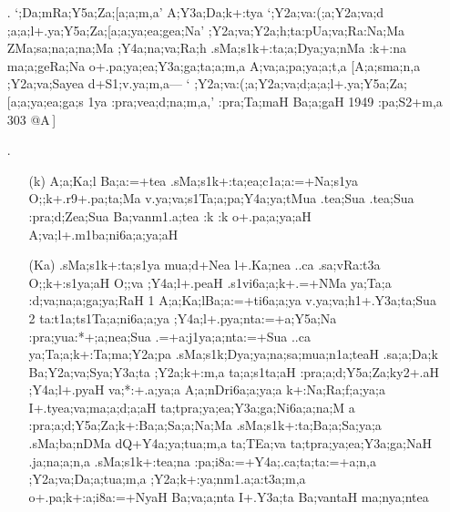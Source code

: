 \begin{spacing}{1.15}
\begin{itemize}
 \item[{\sktf 6}.]  `{\sktf ;Da;mRa;Y5a;Za;[a;a;m,a}' {\sktf
A;Y3a;Da;k+:tya} `{\sktf ;Y2a;va:(;a;Y2a;va;d%
;a;a;l+.ya\ZF{-};Y5a;Za;[a;a;ya;ea;gea;Na}' {\sktf
;Y2a;va;Y2a;h;ta\ZF{-}:pUa{;va;Ra}{:Na;Ma}} {\sktf ZMa;sa;na;a;na;Ma ;Y4a;na;va;Ra;h\ZF{,}} {\sktf
.sMa;s1k+:ta;a;Dya;ya;nMa :k+:na ma;a;geRa;Na
o+.pa;ya;ea;Y3a;ga;ta;a;m,a A;va;a;pa;ya;a;t,a%
} [{\sktf A;a;sma;n,a ;Y2a;va;Sa{yea} d+S1;v.ya;m,a}{\rm ---} `{\sktf
;Y2a;va:(;a;Y2a;va;d;a;a;l+.ya\ZF{-};Y5a;Za;[a;a;ya;ea;ga;s%
1ya :pra;vea;d;na;m,a},' {\sktf :pra;Ta;maH Ba;a;gaH 1949\ZF{,}
:pa;S2+m,a 303 @A}\,]   
 
 \item[{\sktf 7}.] \begin{itemize}
  \item[({\sktf k})]  {\sktf A;a;Ka;l Ba;a:=+tea
.sMa;s1k+:ta;ea;c1a;a:=+Na;s1ya O;;k+.r9+.pa;ta;Ma
v.ya;va;s1Ta;a;pa;Y4a;ya;tMua .tea;Sua .tea;Sua :pra;d;Zea;Sua Ba{;va}nm1.a;tea :k :k o+.pa;a;ya;aH
A;va;l+.m1ba;ni6a;a;ya;aH} 
            
  \item[({\sktf Ka})] {\sktf .sMa;s1k+:ta;s1ya
mua;d+Nea l+.Ka;nea ..ca .sa;vRa:t3a
O;;k+:s1ya;aH O;;va ;Y4a;l+.peaH .s1vi6a;a;k+.=+NMa
\ZF{(}ya;Ta;a\ZF{,} :d;va;na;a;ga;ya;RaH\ZF{)} \ZF{(}1\ZF{)} A;a;Ka;l\ZF{-}Ba;a:=+ti6a;a;ya%
\ZF{-}v.ya;va;h1+.Y3a;ta;Sua\ZF{,} \ZF{(}2\ZF{)} ta:t1a;ts1Ta;a;ni6a;a;ya%
\ZF{-};Y4a;l+.pya;nta:=+a;Y5a;Na :pra;yua:*+;a;nea;Sua
.=+a:j1ya;a;nta:=+Sua ..ca ya;Ta;a;k{+:Ta};ma{;Y2a;pa}} {\sktf .sMa;s1k}{;Dya;ya;na;sa;mua;n1a;teaH%
} {\sktf .sa;a;Da;k Ba;Y2a;va;Sya;Y3a;ta ;Y2a;k+:m,a
ta;a;s1ta;aH :pra;a;d;Y5a;Za;ky2+.aH ;Y4a;l+.pyaH
\ZF{(}va;*:+.a{;ya;a}\ZF{,} A;a;nDri6a;a;ya;a\ZF{,} k+:Na;Ra;f;a;ya;a\ZF{,}
I+.tyea;va;ma;a;d;a;aH\ZF{)} ta;tpra;ya;ea;Y3a;ga;Ni6a;a;na;M%
a :pra;a;d;Y5a;Za;k+:Ba;a;Sa;a;Na;Ma .sMa;s1k+:ta;Ba;a;Sa;ya;a .sMa;ba;nDMa {d}Q{+Y4a;ya};tua;m,a\ZF{,} ta;TEa;va ta;tpra;ya;ea;Y3a;ga;NaH .ja;na;a;n,a
.sMa;s1k+:tea;na :pa;i8a:=+Y4a;.ca;ta;ta:=+a;n,a
;Y2a;va;Da;a;tua;m,a\ZF{,} ;Y2a;k+:ya;nm1.a;a:t3a;m,a
o+.pa;k+:a;i8a:=+NyaH Ba;va;a;nta I+.Y3a;ta Ba{;va}ntaH ma;nya;ntea}
	
 \end{itemize}
\end{itemize}
\end{spacing}

